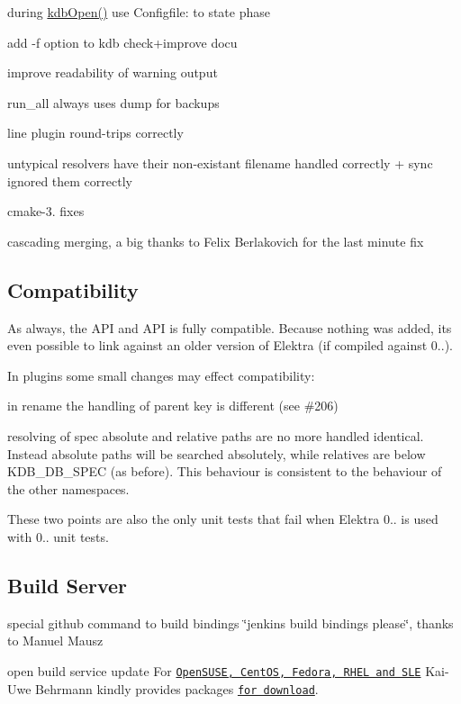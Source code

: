 \begin{DoxyItemize}
\item during \hyperlink{group__kdb_ga6808defe5870f328dd17910aacbdc6ca}{kdb\+Open()} use Configfile\+: to state phase
\item add -\/f option to kdb check+improve docu
\item improve readability of warning output
\item run\+\_\+all always uses dump for backups
\item line plugin round-\/trips correctly
\item untypical resolvers have their non-\/existant filename handled correctly + sync ignored them correctly
\item cmake-\/3. fixes
\item cascading merging, a big thanks to Felix Berlakovich for the last minute fix
\end{DoxyItemize}

\subsection*{Compatibility}

As always, the A\+PI and A\+PI is fully compatible. Because nothing was added, its even possible to link against an older version of Elektra (if compiled against 0..).

In plugins some small changes may effect compatibility\+:


\begin{DoxyItemize}
\item in rename the handling of parent key is different (see \#206)
\item resolving of spec absolute and relative paths are no more handled identical. Instead absolute paths will be searched absolutely, while relatives are below K\+D\+B\+\_\+\+D\+B\+\_\+\+S\+P\+EC (as before). This behaviour is consistent to the behaviour of the other namespaces.
\end{DoxyItemize}

These two points are also the only unit tests that fail when Elektra 0.. is used with 0.. unit tests.

\subsection*{Build Server}


\begin{DoxyItemize}
\item special github command to build bindings \char`\"{}jenkins build bindings please\char`\"{}, thanks to Manuel Mausz
\item open build service update For \href{https://build.opensuse.org/package/show/home:bekun:devel/elektra}{\tt Open\+S\+U\+SE, Cent\+OS, Fedora, R\+H\+EL and S\+LE} Kai-\/\+Uwe Behrmann kindly provides packages \href{http://software.opensuse.org/download.html?project=home%3Abekun%3Adevel&package=libelektra4}{\tt for download}.
\end{DoxyItemize}

